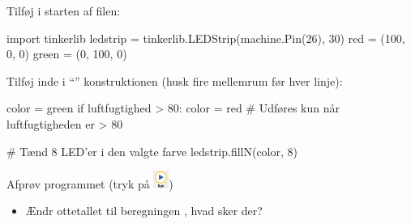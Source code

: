 \documentclass{ucph-handout}
\begin{document}
\begin{exercisebox}[adjusted title=Fugtighed og LED-strip]

Tilføj i starten af filen:
\begin{python}
import tinkerlib
ledstrip = tinkerlib.LEDStrip(machine.Pin(26), 30)
red = (100, 0, 0)
green = (0, 100, 0)
\end{python}

Tilføj inde i "`"' konstruktionen (husk fire mellemrum før hver linje):
\begin{python}
color = green
if luftfugtighed > 80:
    color = red   # Udføres kun når luftfugtigheden er > 80%

# Tænd 8 LED'er i den valgte farve
ledstrip.fillN(color, 8)
\end{python}

Afprøv programmet (tryk på \includegraphics[width=5mm]{illustrationer/run-button})


\begin{itemize}
\item Ændr ottetallet til beregningen , hvad sker der?

\end{itemize}
\end{exercisebox}
\end{document}
